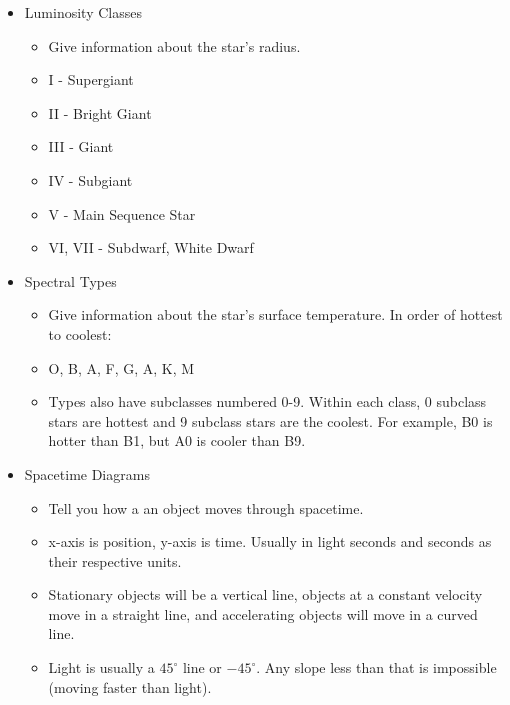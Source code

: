 \documentclass[letterpaper,14pt]{extarticle}
\begin{document}
\begin{itemize}
    \item Luminosity Classes
    \begin{itemize}
        \item Give information about the star's radius.
        \item I - Supergiant
        \item II - Bright Giant
        \item III - Giant
        \item IV - Subgiant
        \item V - Main Sequence Star
        \item VI, VII - Subdwarf, White Dwarf
    \end{itemize}
    \item Spectral Types
    \begin{itemize}
        \item Give information about the star's surface temperature. In order of hottest to coolest:
        \item O, B, A, F, G, A, K, M
        \item Types also have subclasses numbered 0-9. Within each class, 0 subclass stars are hottest and 9 subclass stars are the coolest. For example, B0 is hotter than B1, but A0 is cooler than B9.
    \end{itemize}
    \item Spacetime Diagrams
    \begin{itemize}
        \item Tell you how a an object moves through spacetime.
        \item x-axis is position, y-axis is time. Usually in light seconds and seconds as their respective units.
        \item Stationary objects will be a vertical line, objects at a constant velocity move in a straight line, and accelerating objects will move in a curved line.
        \item Light is usually a $45^\circ$ line or $-45^\circ$. Any slope less than that is impossible (moving faster than light).
        \begin{center}

\end{center}
\end{itemize}
\end{itemize}
\end{document}
